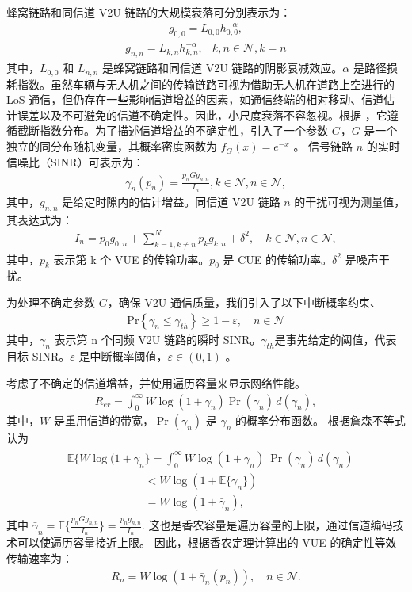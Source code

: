 蜂窝链路和同信道 V2U 链路的大规模衰落可分别表示为：
\begin{eqnarray}\label{3}
g_{0,0}=L_{0,0}h_{0,0}^{-\alpha},
\end{eqnarray}
\begin{eqnarray}\label{4}
g_{n,n}=L_{k,n}h_{k,n}^{-\alpha},          &k, n\in \mathcal{N}, k=n
\end{eqnarray}
其中，$L_{0,0}$ 和 $L_{n,n}$ 是蜂窝链路和同信道 V2U 链路的阴影衰减效应。$\alpha$ 是路径损耗指数。虽然车辆与无人机之间的传输链路可视为借助无人机在道路上空进行的 LoS 通信，但仍存在一些影响信道增益的因素，如通信终端的相对移动、信道估计误差以及不可避免的信道不确定性。因此，小尺度衰落不容忽视。根据 \cite{CCO}，它遵循截断指数分布。为了描述信道增益的不确定性，引入了一个参数 $G$，$G$ 是一个独立的同分布随机变量，其概率密度函数为 $f_G (x)=e^{-x}$ 。
信号链路 $n$ 的实时信噪比（SINR）可表示为：
\begin{eqnarray}\label{5}
\gamma_{n}(p_n)=\frac{p_{n}G g_{n,n}}{I_n}, k\in\mathcal{N},n\in\mathcal{N},
\end{eqnarray}
其中，$g_{n,n}$ 是给定时隙内的估计增益。同信道 V2U 链路 $n$ 的干扰可视为测量值，其表达式为：
\begin{eqnarray}\label{6}
I_n=p_0 g_{0,n}+\!\!\!\sum\limits_{k=1,k\neq n}^N\!\!\!\! p_k g_{k,n}+\delta^2, \quad k\in\mathcal{N},n\in\mathcal{N},
\end{eqnarray}
其中，$p_k$ 表示第 k 个 VUE 的传输功率。$p_0$ 是 CUE 的传输功率。$\delta^2$ 是噪声干扰。

为处理不确定参数 $G$，确保 V2U 通信质量，我们引入了以下中断概率约束、
\begin{eqnarray}\label{7}
\textrm{Pr}\left\{\gamma_{n} \leq \gamma_{th}\right\}\geq1-\varepsilon,\quad  n\in\mathcal{N}
\end{eqnarray}
其中，$\gamma_{n}$ 表示第 n 个同频 V2U 链路的瞬时 SINR。$\gamma_{th}$是事先给定的阈值，代表目标 SINR。$\varepsilon$ 是中断概率阈值，$\varepsilon \in (0,1)$ 。

考虑了不确定的信道增益，并使用遍历容量来显示网络性能。
\begin{eqnarray}\label{8}
R_{er}=\int_{0}^{\infty} W \log(1+\gamma_{n})\Pr(\gamma_{n})\, d(\gamma_{n}),
\end{eqnarray}
其中，$W$ 是重用信道的带宽，$\Pr(\gamma_{n})$ 是 $\gamma_{n}$ 的概率分布函数。 根据詹森不等式
认为
\begin{eqnarray}\label{9}
 \begin{array}{lll}
&\!\!\!\!\!\!\mathbb{E}\{W \log(1+\gamma_{n}\}=\int_{0}^{\infty} W \log(1+\gamma_{n})\ \Pr(\gamma_{n})\, d(\gamma_{n})\\
&\quad\quad\quad\quad\quad\quad\quad\!\!<W\log(1+\mathbb{E}\{\gamma_{n}\})\\
&\quad\quad\quad\quad\quad\quad\quad\!\!=W\log(1+\bar{\gamma}_{n}),
 \end{array}
\end{eqnarray}
其中 $\bar{\gamma}_{n}\!=\mathbb{E}\{\!\frac{p_{n}G g_{n,n}}{I_n}\}
\!=\!\frac{p_{n}g_{n,n}}{I_n}$. 这也是香农容量是遍历容量的上限，通过信道编码技术可以使遍历容量接近上限。
因此，根据香农定理计算出的 VUE 的确定性等效传输速率为：
\begin{eqnarray}\label{10}
R_{n}=W\log(1+\bar{\gamma}_{n}(p_n)),\quad  n\in\mathcal{N}.
\end{eqnarray}
